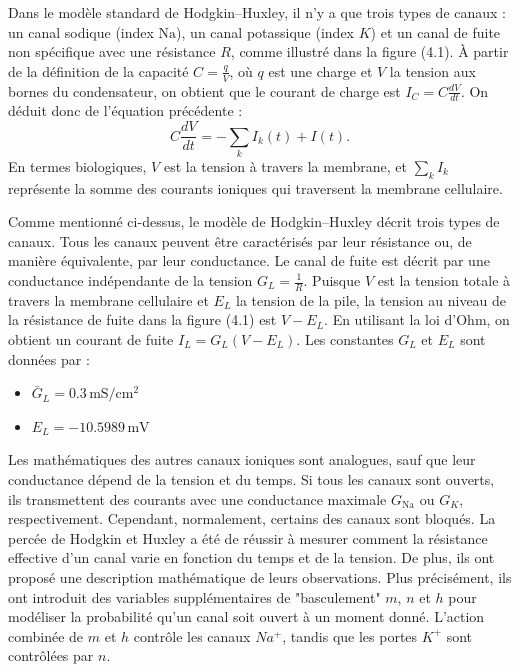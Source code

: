 \documentclass[10pt,french]{beamer}
\begin{document}
	\begin{frame}    
		Dans le modèle standard de Hodgkin–Huxley, il n’y a que trois types de canaux : un canal sodique (index $\text{Na}$), un canal potassique (index $K$) et un canal de fuite non spécifique avec une résistance $R$, comme illustré dans la figure (4.1). À partir de la définition de la capacité $C = \frac{q}{V}$, où $q$ est une charge et $V$ la tension aux bornes du condensateur, on obtient que le courant de charge est $I_C = C \frac{dV}{dt}$. On déduit donc de l’équation précédente :
		\[
		C \frac{dV}{dt} = -\sum_k I_k(t) + I(t).
		\]
		En termes biologiques, $V$ est la tension à travers la membrane, et $\sum_k I_k$ représente la somme des courants ioniques qui traversent la membrane cellulaire.
	\end{frame}
	\begin{frame}
		Comme mentionné ci-dessus, le modèle de Hodgkin–Huxley décrit trois types de canaux. Tous les canaux peuvent être caractérisés par leur résistance ou, de manière équivalente, par leur conductance. Le canal de fuite est décrit par une conductance indépendante de la tension $G_L = \frac{1}{R}$. Puisque $V$ est la tension totale à travers la membrane cellulaire et $E_L$ la tension de la pile, la tension au niveau de la résistance de fuite dans la figure (4.1) est $V - E_L$. En utilisant la loi d'Ohm, on obtient un courant de fuite $I_L = G_L (V - E_L)$.
		Les constantes $G_L$ et $E_L$ sont données par : 
		\begin{itemize}
			\item $\bar{G}_L = 0.3 \, \text{mS}/\text{cm}^2$
			\item $E_L = -10.5989 \, \text{mV}$ 
		\end{itemize}
	\end{frame}
	\begin{frame}
		Les mathématiques des autres canaux ioniques sont analogues, sauf que leur conductance dépend de la tension et du temps. Si tous les canaux sont ouverts, ils transmettent des courants avec une conductance maximale $G_{\text{Na}}$ ou $G_K$, respectivement. Cependant, normalement, certains des canaux sont bloqués. 
		La percée de Hodgkin et Huxley a été de réussir à mesurer comment la résistance effective d’un canal varie en fonction du temps et de la tension. De plus, ils ont proposé une description mathématique de leurs observations. Plus précisément, ils ont introduit des variables supplémentaires de "basculement" $m$, $n$ et $h$ pour modéliser la probabilité qu’un canal soit ouvert à un moment donné.
		L’action combinée de $m$ et $h$ contrôle les canaux $Na^+$, tandis que les portes $K^+$ sont contrôlées par $n$. 
	\end{frame}
\end{document}

